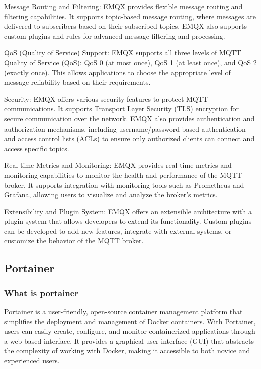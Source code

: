 \documentclass[
12pt,
oneside, 
onehalfspacing, 
nolistspacing, 
parskip, 
chapterinoneline, 
]{AASTCOMPUTER}
\begin{document}
Message Routing and Filtering: EMQX provides flexible message routing and filtering capabilities. It supports topic-based message routing, where messages are delivered to subscribers based on their subscribed topics. EMQX also supports custom plugins and rules for advanced message filtering and processing.

QoS (Quality of Service) Support: EMQX supports all three levels of MQTT Quality of Service (QoS): QoS 0 (at most once), QoS 1 (at least once), and QoS 2 (exactly once). This allows applications to choose the appropriate level of message reliability based on their requirements.

Security: EMQX offers various security features to protect MQTT communications. It supports Transport Layer Security (TLS) encryption for secure communication over the network. EMQX also provides authentication and authorization mechanisms, including username/password-based authentication and access control lists (ACLs) to ensure only authorized clients can connect and access specific topics.

Real-time Metrics and Monitoring: EMQX provides real-time metrics and monitoring capabilities to monitor the health and performance of the MQTT broker. It supports integration with monitoring tools such as Prometheus and Grafana, allowing users to visualize and analyze the broker's metrics.

Extensibility and Plugin System: EMQX offers an extensible architecture with a plugin system that allows developers to extend its functionality. Custom plugins can be developed to add new features, integrate with external systems, or customize the behavior of the MQTT broker.

\subsection{Portainer}

\subsubsection{What is portainer}

Portainer is a user-friendly, open-source container management platform that simplifies the deployment and management of Docker containers. With Portainer, users can easily create, configure, and monitor containerized applications through a web-based interface. It provides a graphical user interface (GUI) that abstracts the complexity of working with Docker, making it accessible to both novice and experienced users.
\end{document}
